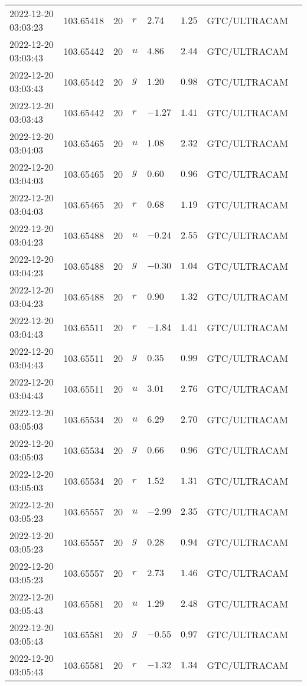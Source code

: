 \documentclass{nature_plusfigure}
\begin{document}
\begin{supplement}
\begin{center}
\begin{longtable}{llllllll}
2022-12-20 03:03:23 & 103.65418 & 20 & $r$ & $2.74$ & $1.25$ & GTC/ULTRACAM &  \\ 
2022-12-20 03:03:43 & 103.65442 & 20 & $u$ & $4.86$ & $2.44$ & GTC/ULTRACAM &  \\ 
2022-12-20 03:03:43 & 103.65442 & 20 & $g$ & $1.20$ & $0.98$ & GTC/ULTRACAM &  \\ 
2022-12-20 03:03:43 & 103.65442 & 20 & $r$ & $-1.27$ & $1.41$ & GTC/ULTRACAM &  \\ 
2022-12-20 03:04:03 & 103.65465 & 20 & $u$ & $1.08$ & $2.32$ & GTC/ULTRACAM &  \\ 
2022-12-20 03:04:03 & 103.65465 & 20 & $g$ & $0.60$ & $0.96$ & GTC/ULTRACAM &  \\ 
2022-12-20 03:04:03 & 103.65465 & 20 & $r$ & $0.68$ & $1.19$ & GTC/ULTRACAM &  \\ 
2022-12-20 03:04:23 & 103.65488 & 20 & $u$ & $-0.24$ & $2.55$ & GTC/ULTRACAM &  \\ 
2022-12-20 03:04:23 & 103.65488 & 20 & $g$ & $-0.30$ & $1.04$ & GTC/ULTRACAM &  \\ 
2022-12-20 03:04:23 & 103.65488 & 20 & $r$ & $0.90$ & $1.32$ & GTC/ULTRACAM &  \\ 
2022-12-20 03:04:43 & 103.65511 & 20 & $r$ & $-1.84$ & $1.41$ & GTC/ULTRACAM &  \\ 
2022-12-20 03:04:43 & 103.65511 & 20 & $g$ & $0.35$ & $0.99$ & GTC/ULTRACAM &  \\ 
2022-12-20 03:04:43 & 103.65511 & 20 & $u$ & $3.01$ & $2.76$ & GTC/ULTRACAM &  \\ 
2022-12-20 03:05:03 & 103.65534 & 20 & $u$ & $6.29$ & $2.70$ & GTC/ULTRACAM &  \\ 
2022-12-20 03:05:03 & 103.65534 & 20 & $g$ & $0.66$ & $0.96$ & GTC/ULTRACAM &  \\ 
2022-12-20 03:05:03 & 103.65534 & 20 & $r$ & $1.52$ & $1.31$ & GTC/ULTRACAM &  \\ 
2022-12-20 03:05:23 & 103.65557 & 20 & $u$ & $-2.99$ & $2.35$ & GTC/ULTRACAM &  \\ 
2022-12-20 03:05:23 & 103.65557 & 20 & $g$ & $0.28$ & $0.94$ & GTC/ULTRACAM &  \\ 
2022-12-20 03:05:23 & 103.65557 & 20 & $r$ & $2.73$ & $1.46$ & GTC/ULTRACAM &  \\ 
2022-12-20 03:05:43 & 103.65581 & 20 & $u$ & $1.29$ & $2.48$ & GTC/ULTRACAM &  \\ 
2022-12-20 03:05:43 & 103.65581 & 20 & $g$ & $-0.55$ & $0.97$ & GTC/ULTRACAM &  \\ 
2022-12-20 03:05:43 & 103.65581 & 20 & $r$ & $-1.32$ & $1.34$ & GTC/ULTRACAM &  \\ 

\end{longtable}
\end{center}
\end{supplement}
\end{document}
